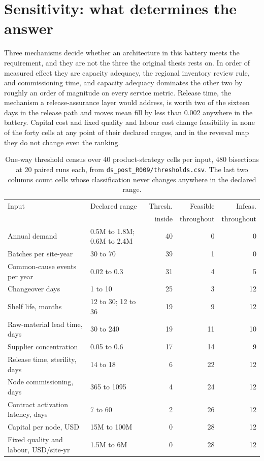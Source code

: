 \section{Sensitivity: what determines the answer}
\label{sec:sensitivity}

Three mechanisms decide whether an architecture in this battery meets the requirement, and they
are not the three the original thesis rests on. In order of measured effect they are capacity
adequacy, the regional inventory review rule, and commissioning time, and capacity adequacy
dominates the other two by roughly an order of magnitude on every service metric. Release time,
the mechanism a release-assurance layer would address, is worth two of the sixteen days in the
release path and moves mean fill by less than 0.002 anywhere in the battery. Capital cost and
fixed quality and labour cost change feasibility in none of the forty cells at any point of their
declared ranges, and in the reversal map they do not change even the ranking.

\begin{table}[htbp]
\centering
\caption{One-way threshold census over 40 product-strategy cells per input, 480 bisections at 20
paired runs each, from \texttt{ds\_post\_R009/thresholds.csv}. The last two columns count cells
whose classification never changes anywhere in the declared range.}
\label{tab:census}
\footnotesize
\setlength{\tabcolsep}{5pt}
\begin{tabular}{@{}llrrr@{}}
\toprule
Input & Declared range & Thresh. & Feasible & Infeas. \\
      &                & inside  & throughout & throughout \\
\midrule
Annual demand & 0.5M to 1.8M; 0.6M to 2.4M & 40 & 0 & 0 \\
Batches per site-year & 30 to 70 & 39 & 1 & 0 \\
Common-cause events per year & 0.02 to 0.3 & 31 & 4 & 5 \\
Changeover days & 1 to 10 & 25 & 3 & 12 \\
Shelf life, months & 12 to 30; 12 to 36 & 19 & 9 & 12 \\
Raw-material lead time, days & 30 to 240 & 19 & 11 & 10 \\
Supplier concentration & 0.05 to 0.6 & 17 & 14 & 9 \\
Release time, sterility, days & 14 to 18 & 6 & 22 & 12 \\
Node commissioning, days & 365 to 1095 & 4 & 24 & 12 \\
Contract activation latency, days & 7 to 60 & 2 & 26 & 12 \\
Capital per node, USD & 15M to 100M & 0 & 28 & 12 \\
Fixed quality and labour, USD/site-yr & 1.5M to 6M & 0 & 28 & 12 \\
\bottomrule
\end{tabular}
\end{table}

